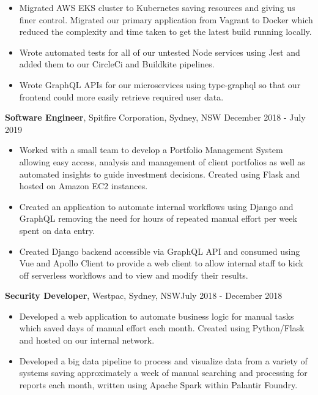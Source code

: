 \documentclass[overlapped]{res}
\begin{document}
\begin{resume}
\begin{itemize}
\item Migrated AWS EKS cluster to Kubernetes saving resources and giving us finer control. Migrated our primary application from Vagrant to Docker which reduced the complexity and time taken to get the latest build running locally.

\item Wrote automated tests for all of our untested Node services using Jest and added them to our CircleCi and Buildkite pipelines.

\item Wrote GraphQL APIs for our microservices using type-graphql so that our frontend could more easily retrieve required user data.

\end{itemize}

{\bf Software Engineer},
	Spitfire Corporation, Sydney, NSW \hfill December 2018 - July 2019
\begin{itemize} \itemsep 2pt  %

\item Worked with a small team to develop a Portfolio Management System allowing easy access, analysis and management of client portfolios as well as automated insights to guide investment decisions. Created using Flask and hosted on Amazon EC2 instances.

\item Created an application to automate internal workflows using Django and GraphQL removing the need for hours of repeated manual effort per week spent on data entry.

\item Created Django backend accessible via GraphQL API and consumed using Vue and Apollo Client to provide a web client to allow internal staff to kick off serverless workflows and to view and modify their results.

\end{itemize}

{\bf Security Developer},
	Westpac, Sydney, NSW\hfill July 2018 - December 2018
\begin{itemize} \itemsep 2pt  %

\item Developed a web application to automate business logic for manual tasks which saved days of manual effort each month. Created using Python/Flask and hosted on our internal network.

\item Developed a big data pipeline to process and visualize data from a variety of systems saving approximately a week of manual searching and processing for reports each month, written using Apache Spark within Palantir Foundry.


\end{itemize}
\end{resume}
\end{document}
